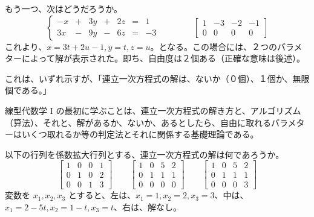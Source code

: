 もう一つ、次はどうだろうか。
$$\left\{\begin{array}{rrrrrrr}
-x & + & 3y & + & 2z & = & 1\\
3x & - & 9y & - & 6z & = & -3
\end{array}\right.\qquad\qquad
\left[\begin{array}{cccc}
1 & -3 & -2 & -1\\
0 & 0 & 0 & 0
\end{array}
\right]$$
これより、$x = 3t + 2u -1, y = t, z = u$。となる。この場合には、２つのパラメターによって解が表示された。即ち、自由度は２個ある（正確な意味は後述）。

\medskip
これは、いずれ示すが、{\gt 「連立一次方程式の解は、ないか（０個）、１個か、無限個である。」}

線型代数学 I の最初に学ぶことは、連立一次方程式の解き方と、アルゴリズム（算法）、それと、解があるか、ないか、あるとしたら、自由に取れるパラメターはいくつ取れるか等の判定法とそれに関係する基礎理論である。


\medskip
以下の行列を係数拡大行列とする、連立一次方程式の解は何であろうか。
$$\left[\begin{array}{cccc}
1 & 0 & 0 & 1\\
0 & 1 & 0 & 2\\
0 & 0 & 1 & 3
\end{array}\right]\qquad
\left[\begin{array}{cccc}
1 & 0 & 5 & 2\\
0 & 1 & 1 & 1\\
0 & 0 & 0 & 0
\end{array}\right]\qquad 
\left[\begin{array}{cccc}
1 & 0 & 5 & 2\\
0 & 1 & 1 & 1\\
0 & 0 & 0 & 3
\end{array}\right]$$
変数を $x_1, x_2, x_3$ とすると、左は、$x_1 = 1, x_2 = 2, x_3 = 3$、中は、$x_1 = 2-5t, x_2 = 1-t, x_3 = t$、右は、解なし。

